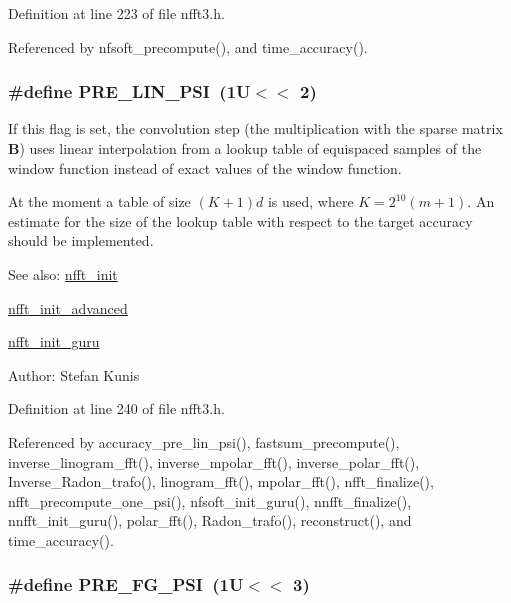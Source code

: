 Definition at line 223 of file nfft3.h.

Referenced by nfsoft\_\-precompute(), and time\_\-accuracy().\hypertarget{group__nfft_gbb1ad048b695cb806baf010c5d1b2caf}{
\subsubsection{\setlength{\rightskip}{0pt plus 5cm}\#define PRE\_\-LIN\_\-PSI~(1U$<$$<$ 2)}}
\label{group__nfft_gbb1ad048b695cb806baf010c5d1b2caf}


If this flag is set, the convolution step (the multiplication with the sparse matrix $\mathbf{B}$) uses linear interpolation from a lookup table of equispaced samples of the window function instead of exact values of the window function. 

At the moment a table of size $(K+1)d$ is used, where $K=2^{10}(m+1)$. An estimate for the size of the lookup table with respect to the target accuracy should be implemented.

\begin{Desc}
\item[See also:]\hyperlink{group__nfft_g1dfeaf18f3735f035afa62ca768d99c4}{nfft\_\-init} 

\hyperlink{group__nfft_gcd4a22fd1f6ea476a57759a90510d114}{nfft\_\-init\_\-advanced} 

\hyperlink{group__nfft_g406f05717c6299b918261c61aaa9de23}{nfft\_\-init\_\-guru} \end{Desc}
\begin{Desc}
\item[Author:]Stefan Kunis \end{Desc}


Definition at line 240 of file nfft3.h.

Referenced by accuracy\_\-pre\_\-lin\_\-psi(), fastsum\_\-precompute(), inverse\_\-linogram\_\-fft(), inverse\_\-mpolar\_\-fft(), inverse\_\-polar\_\-fft(), Inverse\_\-Radon\_\-trafo(), linogram\_\-fft(), mpolar\_\-fft(), nfft\_\-finalize(), nfft\_\-precompute\_\-one\_\-psi(), nfsoft\_\-init\_\-guru(), nnfft\_\-finalize(), nnfft\_\-init\_\-guru(), polar\_\-fft(), Radon\_\-trafo(), reconstruct(), and time\_\-accuracy().\hypertarget{group__nfft_g9c5a5ab61009a801082897ca40a1658c}{
\subsubsection{\setlength{\rightskip}{0pt plus 5cm}\#define PRE\_\-FG\_\-PSI~(1U$<$$<$ 3)}}
\label{group__nfft_g9c5a5ab61009a801082897ca40a1658c}


